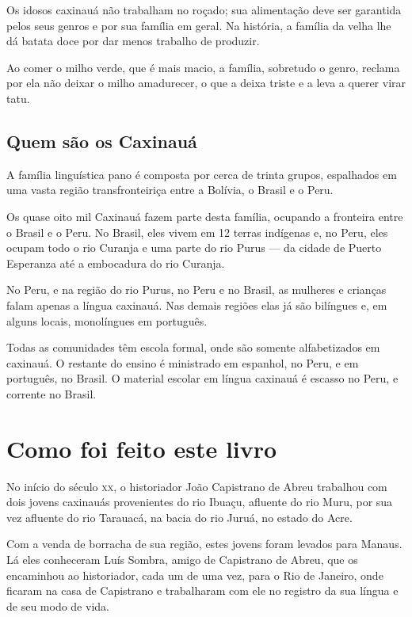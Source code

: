 Os idosos caxinauá não trabalham no roçado; sua alimentação deve ser garantida pelos seus genros e por sua família em geral. Na história, a família da velha lhe dá batata doce
por dar menos trabalho de produzir.

Ao comer o milho verde, que é mais macio, a família, sobretudo o genro, reclama por ela não deixar o milho amadurecer, o que a deixa triste e a leva a querer virar tatu.

\section{Quem são os Caxinauá}

A família linguística pano é composta por cerca de trinta grupos, espalhados em uma vasta região transfronteiriça entre a Bolívia, o Brasil e o Peru.

Os quase oito mil Caxinauá fazem parte desta família, ocupando a fronteira entre o Brasil
e o Peru. No Brasil, eles vivem em 12 terras indígenas e, no Peru, eles ocupam todo o rio Curanja e uma parte do rio Purus --- da cidade de Puerto Esperanza até a embocadura
do rio Curanja.

No Peru, e na região do rio Purus, no Peru e no Brasil, as mulheres e crianças falam apenas a língua caxinauá. Nas demais regiões elas já são bilíngues e, em alguns locais,
monolíngues em português.

Todas as comunidades têm escola formal, onde são somente alfabetizados em caxinauá. O
restante do ensino é ministrado em espanhol, no Peru, e em português, no Brasil. O material escolar em língua caxinauá é escasso no Peru, e corrente no Brasil.

\chapter{Como foi feito este livro}

No início do século \textsc{xx}, o historiador João Capistrano de Abreu trabalhou
com dois jovens caxinauás provenientes do rio Ibuaçu, afluente do rio Muru, por sua vez afluente do rio Tarauacá, na bacia do rio Juruá, no estado do Acre.

Com a venda de borracha de sua região, estes jovens foram levados para Manaus. Lá eles conheceram Luís Sombra, amigo de Capistrano de Abreu, que os encaminhou ao historiador, cada um de uma vez, para o Rio de Janeiro, onde ficaram na casa de Capistrano e trabalharam
com ele no registro da sua língua e de seu modo de vida.

